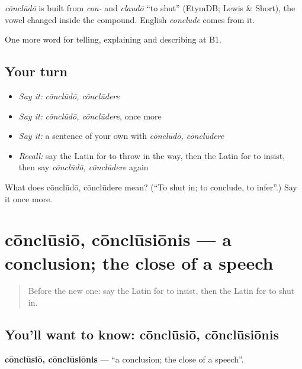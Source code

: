 \begin{cousinweb}
\emph{cōnclūdō} is built from \emph{con-} and \emph{claudō} \textquotedblleft{}to shut\textquotedblright{} (EtymDB; Lewis \& Short), the vowel changed inside the compound. English \emph{conclude} comes from it.
\end{cousinweb}

\begin{grammarlens}[title={What you've built}]
One more word for telling, explaining and describing at B1.
\end{grammarlens}

\subsection*{Your turn}
\begin{itemize}
\raggedright
  \item \emph{Say it:} \emph{cōnclūdō, cōnclūdere}
  \item \emph{Say it:} \emph{cōnclūdō, cōnclūdere}, once more
  \item \emph{Say it:} a sentence of your own with \emph{cōnclūdō, cōnclūdere}
  \item \emph{Recall:} say the Latin for to throw in the way, then the Latin for to insist, then say \emph{cōnclūdō, cōnclūdere} again
\end{itemize}

\begin{tcolorbox}[breakable,colback=teal!4,colframe=teal!35!black,title={Before you move on}]
What does cōnclūdō, cōnclūdere mean? (\textquotedblleft{}To shut in; to conclude, to infer\textquotedblright{}.) Say it once more.
\end{tcolorbox}
\section[cōnclūsiō, cōnclūsiōnis]{cōnclūsiō, cōnclūsiōnis — a conclusion; the close of a speech}

\label{lesson:LA-C364-conclusio}



\begin{quote}
Before the new one: say the Latin for to insist, then the Latin for to shut in.
\end{quote}

\subsection*{You'll want to know: cōnclūsiō, cōnclūsiōnis}
\textbf{cōnclūsiō, cōnclūsiōnis} — \textquotedblleft{}a conclusion; the close of a speech\textquotedblright{}.

